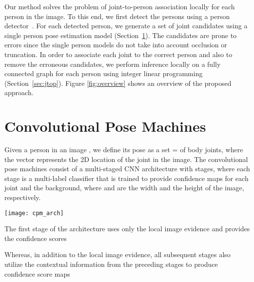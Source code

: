 \documentclass[runningheads]{llncs}
\begin{document}
Our method solves the problem of joint-to-person association locally for each person in the image. To this end, we first detect the persons using a person detector~\cite{ren2015faster}. For each detected person, we generate a set of joint candidates using a single person pose estimation model (Section~\ref{sec:cpm}). The candidates are prone to errors since the single person models do not take into account occlusion or truncation. In order to associate each joint to the correct person and also to remove the erroneous candidates, we perform inference locally on a fully connected graph for each person using integer linear programming (Section~\ref{sec:jtop}). Figure \ref{fig:overview} shows an overview of the proposed approach.

\section{Convolutional Pose Machines}
\label{sec:cpm}

Given a person in an image , we define its pose as a set  =  of  body joints, where the vector  represents the 2D location  of the  joint in the image. The convolutional pose machines consist of a multi-staged CNN architecture with  stages, where each stage is a multi-label classifier  that is trained to provide confidence maps  for each joint  and the background, where  and  are the width and the height of the image, respectively.
 
\begin{figure*}[t!]
\centering
\captionsetup[figure]{skip=0pt}
\texttt{[image: cpm\_arch]}
\caption{CPM architecture proposed in \cite{wei2016convolutional}. The first stage (a) utilizes only the local image evidence whereas all subsequent stages (b) also utilize the output of preceding stages to exploit the spatial context between joints. The receptive field of stages  is increased by having multiple convolutional layers at the  times down-sampled score maps. All stages are locally supervised and a separate loss is computed for each stage. We provide multi-person target score maps to stage 1, and single-person score maps to all subsequent stages.}
\label{fig:cpm_arch}
\end{figure*}

The first stage of the architecture uses only the local image evidence and provides the confidence scores

Whereas, in addition to the local image evidence, all subsequent stages also utilize the contextual information from the preceding stages to produce confidence score maps
\end{document}
